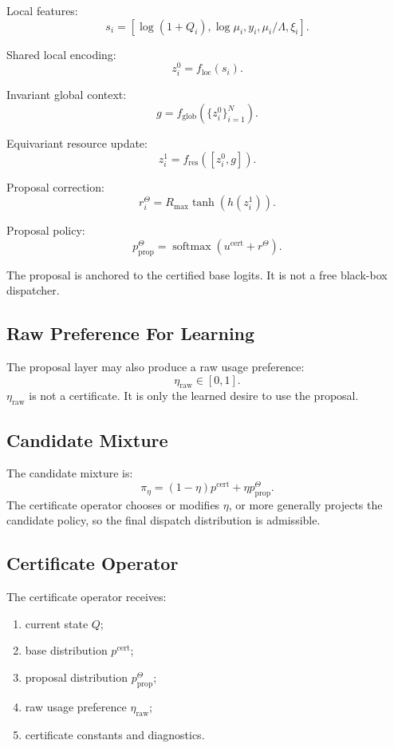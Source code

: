 \documentclass[a4paper,11pt]{article}
\theoremstyle{definition}
\begin{document}
Local features:
\[
s_i=[
\log(1+Q_i),
\log\mu_i,
y_i,
\mu_i/\Lambda,
\xi_i
].
\]

Shared local encoding:
\[
z_i^0=f_{\mathrm{loc}}(s_i).
\]

Invariant global context:
\[
g=f_{\mathrm{glob}}(\{z_i^0\}_{i=1}^N).
\]

Equivariant resource update:
\[
z_i^1=f_{\mathrm{res}}([z_i^0,g]).
\]

Proposal correction:
\[
r_i^\Theta=R_{\max}\tanh(h(z_i^1)).
\]

Proposal policy:
\[
p^\Theta_{\mathrm{prop}}
=
\operatorname{softmax}(u^{\mathrm{cert}}+r^\Theta).
\]

The proposal is anchored to the certified base logits. It is not a free
black-box dispatcher.

\subsection{Raw Preference For Learning}

The proposal layer may also produce a raw usage preference:
\[
\eta_{\mathrm{raw}}\in[0,1].
\]
\(\eta_{\mathrm{raw}}\) is not a certificate. It is only the learned desire to
use the proposal.

\subsection{Candidate Mixture}

The candidate mixture is:
\[
\pi_\eta
=
(1-\eta)p^{\mathrm{cert}}
+
\eta p^\Theta_{\mathrm{prop}}.
\]
The certificate operator chooses or modifies \(\eta\), or more generally
projects the candidate policy, so the final dispatch distribution is
admissible.

\subsection{Certificate Operator}

The certificate operator receives:
\begin{enumerate}
  \item current state \(Q\);
  \item base distribution \(p^{\mathrm{cert}}\);
  \item proposal distribution \(p^\Theta_{\mathrm{prop}}\);
  \item raw usage preference \(\eta_{\mathrm{raw}}\);
  \item certificate constants and diagnostics.
\end{enumerate}
\end{document}
